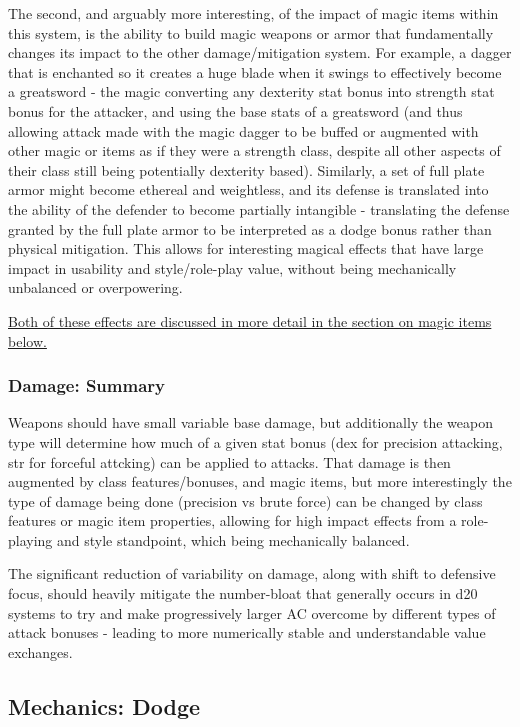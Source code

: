 \documentclass{article}
\begin{document}
            The second, and arguably more interesting, of the impact of magic items within this system, is the ability to build magic weapons or armor that fundamentally changes its impact to the other damage/mitigation system. For example, a dagger that is enchanted so it creates a huge blade when it swings to effectively become a greatsword - the magic converting any dexterity stat bonus into strength stat bonus for the attacker, and using the base stats of a greatsword (and thus allowing attack made with the magic dagger to be buffed or augmented with other magic or items as if they were a strength class, despite all other aspects of their class still being potentially dexterity based). Similarly, a set of full plate armor might become ethereal and weightless, and its defense is translated into the ability of the defender to become partially intangible - translating the defense granted by the full plate armor to be interpreted as a dodge bonus rather than physical mitigation. This allows for interesting magical effects that have large impact in usability and style/role-play value, without being mechanically unbalanced or overpowering.
            
            \hyperref[sec:MagicItems]{Both of these effects are discussed in more detail in the section on magic items below.}
        
        \subsubsection{Damage: Summary}
            Weapons should have small variable base damage, but additionally the weapon type will determine how much of a given stat bonus (dex for precision attacking, str for forceful attcking) can be applied to attacks. That damage is then augmented by class features/bonuses, and magic items, but more interestingly the type of damage being done (precision vs brute force) can be changed by class features or magic item properties, allowing for high impact effects from a role-playing and style standpoint, which being mechanically balanced. 
            
            The significant reduction of variability on damage, along with shift to defensive focus, should heavily mitigate the number-bloat that generally occurs in d20 systems to try and make progressively larger AC overcome by different types of attack bonuses - leading to more numerically stable and understandable value exchanges.
        
    \subsection{Mechanics: Dodge}\label{subsec:dodge}
        
\end{document}
